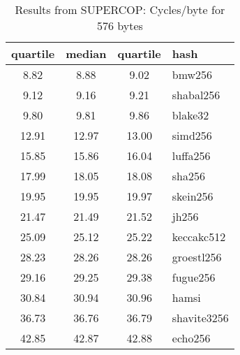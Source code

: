 \begin{table}
  \centering
  \begin{tabular}{ | c | c | c | l | }
    \hline
    \textbf{quartile} & \textbf{median} & \textbf{quartile} & \textbf{hash} \\ \hline
    8.82 & 8.88 & 9.02 & bmw256 \\ \hline
    9.12 & 9.16 & 9.21 & shabal256 \\ \hline
    9.80 & 9.81 & 9.86 & blake32 \\ \hline
    12.91 & 12.97 & 13.00 & simd256 \\ \hline
    15.85 & 15.86 & 16.04 & luffa256 \\ \hline
    17.99 & 18.05 & 18.08 & sha256 \\ \hline
    19.95 & 19.95 & 19.97 & skein256 \\ \hline
    21.47 & 21.49 & 21.52 & jh256 \\ \hline
    25.09 & 25.12 & 25.22 & keccakc512 \\ \hline
    28.23 & 28.26 & 28.26 & groestl256 \\ \hline
    29.16 & 29.25 & 29.38 & fugue256 \\ \hline
    30.84 & 30.94 & 30.96 & hamsi \\ \hline
    36.73 & 36.76 & 36.79 & shavite3256 \\ \hline
    42.85 & 42.87 & 42.88 & echo256 \\ \hline
  \end{tabular}
  \caption{Results from SUPERCOP: Cycles/byte for 576 bytes}
  \label{tbl:supercop:576}
\end{table}
